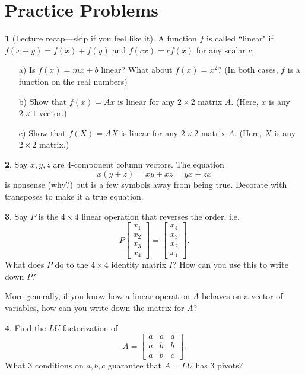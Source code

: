 \documentclass{article}
\theoremstyle{definition}
\newtheorem{prob}{}
\begin{document}
\section*{Practice Problems}
\begin{prob}[Lecture recap---skip if you feel like it] A function $f$ is called ``linear" if $f(x+y)=f(x) + f(y)$ and $f(cx)=c f(x)$ for any scalar $c$.
	\begin{itemize}
		\item [a)] Is $f(x)=m x +b$ linear? What about $f(x)=x^2$? (In both cases, $f$ is a function on the real numbers)
		\item [b)] Show that $f(x)=Ax$ is linear for any $2 \times 2$ matrix $A$. (Here, $x$ is any $2 \times 1$ vector.)
		\item [c)] Show that $f(X)=AX$ is linear for any $2 \times 2$ matrix $A$. (Here, $X$ is any $2 \times 2$ matrix.)
	\end{itemize}
\end{prob}

\begin{prob}
	Say $x, y, z$ are $4$-component column vectors. The equation
	$$x(y+z)=xy + xz = yx + zx$$
	is nonsense (why?) but is a few symbols away from being true. Decorate with transposes to make it a true equation.
\end{prob}
 

\begin{prob}
Say $P$ is the $4 \times 4$ linear operation that reverses the order, i.e.
\[P \begin{bmatrix}
	x_1 \\ x_2 \\ x_3\\ x_4
\end{bmatrix}= \begin{bmatrix}
x_4 \\ x_3 \\ x_2\\ x_1
\end{bmatrix}.\]
What does $P$ do to the $4 \times 4$ identity matrix $I$? How can you use this to write down $P$?

More generally, if you know how a linear operation $A$ behaves on a vector of variables, how can you write down the matrix for $A$?
\end{prob}

\begin{prob}
	Find the $LU$ factorization of 
	\[A=\begin{bmatrix}
		a & a & a\\
		a & b & b\\
		a & b& c
	\end{bmatrix}.\]
What 3 conditions on $a, b, c$ guarantee that $A=LU$ has 3 pivots?
\end{prob}
\end{document}
